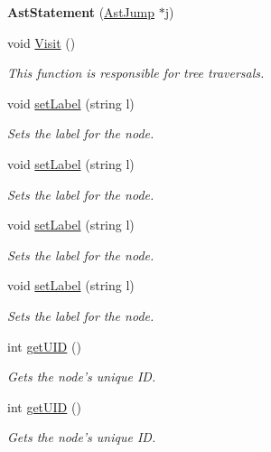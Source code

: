\begin{DoxyCompactItemize}
\item 
\hypertarget{classAstStatement_a80c754bbc909f7e2e7938e90485d7065}{{\bfseries Ast\-Statement} (\hyperlink{classAstJump}{Ast\-Jump} $\ast$j)}\label{classAstStatement_a80c754bbc909f7e2e7938e90485d7065}

\item 
void \hyperlink{classAstStatement_a1f1570931e373fe2f1e18ce417236ee4}{Visit} ()
\begin{DoxyCompactList}\small\item\em This function is responsible for tree traversals. \end{DoxyCompactList}\item 
void \hyperlink{classAST_a71d680856e95ff89f55d5311a552eba6}{set\-Label} (string l)
\begin{DoxyCompactList}\small\item\em Sets the label for the node. \end{DoxyCompactList}\item 
void \hyperlink{classAST_a71d680856e95ff89f55d5311a552eba6}{set\-Label} (string l)
\begin{DoxyCompactList}\small\item\em Sets the label for the node. \end{DoxyCompactList}\item 
void \hyperlink{classAST_a71d680856e95ff89f55d5311a552eba6}{set\-Label} (string l)
\begin{DoxyCompactList}\small\item\em Sets the label for the node. \end{DoxyCompactList}\item 
void \hyperlink{classAST_a71d680856e95ff89f55d5311a552eba6}{set\-Label} (string l)
\begin{DoxyCompactList}\small\item\em Sets the label for the node. \end{DoxyCompactList}\item 
int \hyperlink{classAST_ab7a5b1d9f1c2de0d98deb356f724a42c}{get\-U\-I\-D} ()
\begin{DoxyCompactList}\small\item\em Gets the node's unique I\-D. \end{DoxyCompactList}\item 
int \hyperlink{classAST_ab7a5b1d9f1c2de0d98deb356f724a42c}{get\-U\-I\-D} ()
\begin{DoxyCompactList}\small\item\em Gets the node's unique I\-D. \end{DoxyCompactList}\item 

\end{DoxyCompactItemize}
